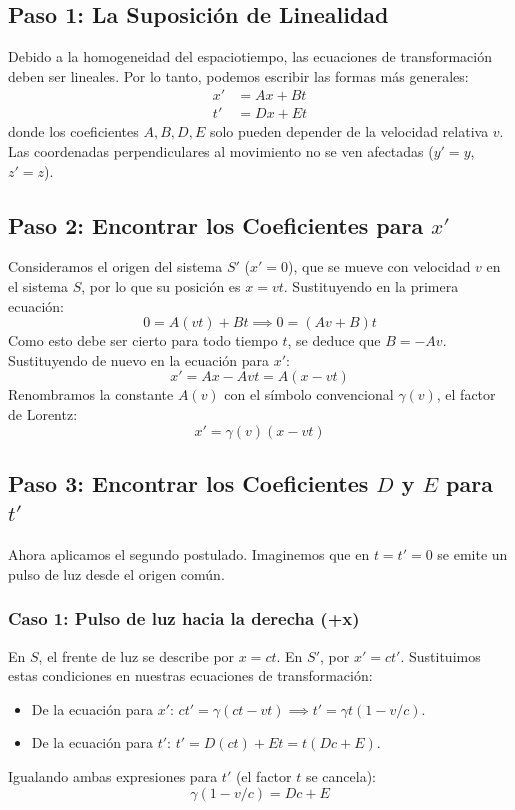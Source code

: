 \documentclass[11pt,a4paper]{article}
\begin{document}
\subsection*{Paso 1: La Suposición de Linealidad}
Debido a la homogeneidad del espaciotiempo, las ecuaciones de transformación deben ser lineales. Por lo tanto, podemos escribir las formas más generales:
\begin{align*}
    x' &= Ax + Bt \\
    t' &= Dx + Et
\end{align*}
donde los coeficientes $A, B, D, E$ solo pueden depender de la velocidad relativa $v$. Las coordenadas perpendiculares al movimiento no se ven afectadas ($y'=y$, $z'=z$).

\subsection*{Paso 2: Encontrar los Coeficientes para \texorpdfstring{$x'$}{x'}}
Consideramos el origen del sistema $S'$ ($x'=0$), que se mueve con velocidad $v$ en el sistema $S$, por lo que su posición es $x=vt$. Sustituyendo en la primera ecuación:
\[ 0 = A(vt) + Bt \implies 0 = (Av + B)t \]
Como esto debe ser cierto para todo tiempo $t$, se deduce que $B = -Av$. Sustituyendo de nuevo en la ecuación para $x'$:
\[ x' = Ax - Avt = A(x-vt) \]
Renombramos la constante $A(v)$ con el símbolo convencional $\gamma(v)$, el factor de Lorentz:
\begin{equation} \label{eq:x_prime_trans}
    \boxed{x' = \gamma(v)(x - vt)}
\end{equation}

\subsection*{Paso 3: Encontrar los Coeficientes \texorpdfstring{$D$}{D} y \texorpdfstring{$E$}{E} para \texorpdfstring{$t'$}{t'}}
Ahora aplicamos el segundo postulado. Imaginemos que en $t=t'=0$ se emite un pulso de luz desde el origen común.

\subsubsection*{Caso 1: Pulso de luz hacia la derecha (+x)}
En $S$, el frente de luz se describe por $x = ct$. En $S'$, por $x' = ct'$. Sustituimos estas condiciones en nuestras ecuaciones de transformación:
\begin{itemize}
    \item De la ecuación para $x'$: $ct' = \gamma(ct - vt) \implies t' = \gamma t (1 - v/c)$.
    \item De la ecuación para $t'$: $t' = D(ct) + Et = t(Dc + E)$.
\end{itemize}
Igualando ambas expresiones para $t'$ (el factor $t$ se cancela):
\begin{equation} \label{eq:sys1}
    \gamma (1 - v/c) = Dc + E
\end{equation}
\end{document}

